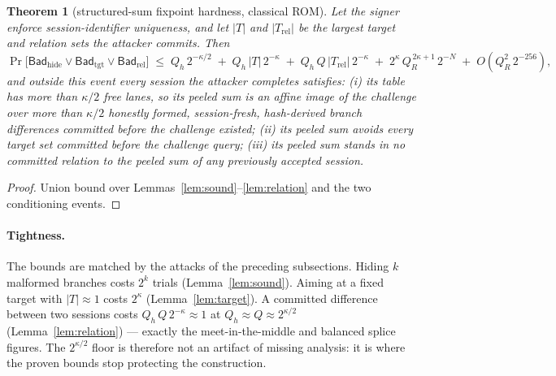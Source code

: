 \documentclass[11pt]{article}
\newcommand{\Bad}{\mathsf{Bad}}
\newtheorem{theorem}{Theorem}[section]
\begin{document}
\begin{theorem}[structured-sum fixpoint hardness, classical ROM]
\label{thm:fixpoint}
Let the signer enforce session-identifier uniqueness, and let
$|T|$ and $|T_{\mathrm{rel}}|$ be the largest target and relation sets the
attacker commits.  Then
\[
 \Pr\bigl[\Bad_{\mathrm{hide}}\vee\Bad_{\mathrm{tgt}}\vee
 \Bad_{\mathrm{rel}}\bigr]
 \;\le\;
 Q_h\,2^{-\kappa/2}
 \;+\;Q_h\,|T|\,2^{-\kappa}
 \;+\;Q_h\,Q\,|T_{\mathrm{rel}}|\,2^{-\kappa}
 \;+\;2^{\kappa}\,Q_R^{\,2\kappa+1}\,2^{-N}
 \;+\;O(Q_R^{2}\,2^{-256}),
\]
and outside this event every session the attacker completes satisfies:
(i) its table has more than $\kappa/2$ free lanes, so its peeled sum is an
affine image of the challenge over more than $\kappa/2$ honestly formed,
session-fresh, hash-derived branch differences committed before the challenge
existed;
(ii) its peeled sum avoids every target set committed before the challenge
query;
(iii) its peeled sum stands in no committed relation to the peeled sum of any
previously accepted session.
\end{theorem}

\begin{proof}
Union bound over Lemmas~\ref{lem:sound}--\ref{lem:relation} and the two
conditioning events.
\end{proof}

\paragraph{Tightness.}
The bounds are matched by the attacks of the preceding subsections.  Hiding
$k$ malformed branches costs $2^{k}$ trials (Lemma~\ref{lem:sound}).  Aiming
at a fixed target with $|T|\approx1$ costs $2^{\kappa}$
(Lemma~\ref{lem:target}).  A committed difference between two sessions costs
$Q_h\,Q\,2^{-\kappa}\approx1$ at $Q_h\approx Q\approx2^{\kappa/2}$
(Lemma~\ref{lem:relation}) --- exactly the meet-in-the-middle and balanced
splice figures.  The $2^{\kappa/2}$ floor is therefore not an artifact of
missing analysis: it is where the proven bounds stop protecting the
construction.
\end{document}
